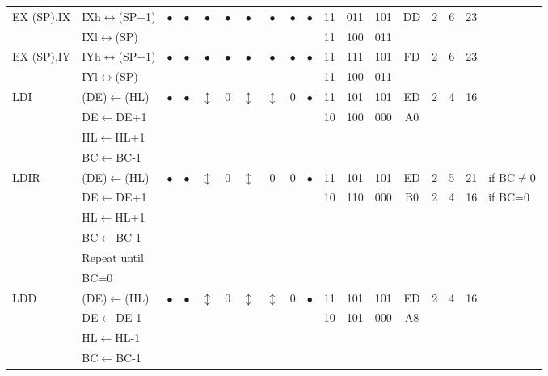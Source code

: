 \documentclass[oneside,a4paper]{book}
\begin{document}
{\begin{tabular}{llc@{ }c@{ }c@{ }c@{ }c@{ }c@{ }c@{ }cc@{ }c@{ }cccccll}
EX (SP),IX & IXh$\leftrightarrow$(SP+1) & 
	$\bullet$ & $\bullet$ & $\bullet$ & $\bullet$ & $\bullet$ & $\bullet$ & $\bullet$ & $\bullet$ & 11 & 011 & 101
	& DD & 2 & 6 & 23 & & \\ 
	& IXl$\leftrightarrow$(SP) & \multicolumn{8}{c}{} & 11 & 100 & 011 & \multicolumn{4}{c}{} & & \\ 

EX (SP),IY & IYh$\leftrightarrow$(SP+1) & 
	$\bullet$ & $\bullet$ & $\bullet$ & $\bullet$ & $\bullet$ & $\bullet$ & $\bullet$ & $\bullet$ & 11 & 111 & 101
	& FD & 2 & 6 & 23 & & \\ 
	& IYl$\leftrightarrow$(SP) & \multicolumn{8}{c}{} & 11 & 100 & 011 & \multicolumn{4}{c}{} & & \\ 

LDI & (DE)$\leftarrow$(HL) & 
	$\bullet$ & $\bullet$ & $\updownarrow$\footnotemark[4] & 0 & $\updownarrow$\footnotemark[4] & $\updownarrow$\footnotemark[1] & 0 & $\bullet$ & 11 & 101 & 101
	& ED & 2 & 4 & 16 & & \\ 
	& DE$\leftarrow$DE+1 & \multicolumn{8}{c}{} & 10 & 100 & 000 & A0 & \multicolumn{3}{c}{} & & \\ 
	& HL$\leftarrow$HL+1 & \multicolumn{15}{c}{} & & \\
	& BC$\leftarrow$BC-1 & \multicolumn{15}{c}{} & & \\ 

LDIR & (DE)$\leftarrow$(HL) & 
	$\bullet$ & $\bullet$ & $\updownarrow$\footnotemark[4] & 0 & $\updownarrow$\footnotemark[4] & 0\footnotemark[2] & 0 & $\bullet$ & 11 & 101 & 101
	& ED & 2 & 5 & 21 & \multicolumn{2}{l}{if BC$\not=$0} \\ 
	& DE$\leftarrow$DE+1 & \multicolumn{8}{c}{} & 10 & 110 & 000 & B0 & 2 & 4 & 16 & \multicolumn{2}{l}{if BC=0} \\
	& HL$\leftarrow$HL+1 & \multicolumn{15}{c}{} & & \\
	& BC$\leftarrow$BC-1 & \multicolumn{15}{c}{} & & \\ 
	& Repeat until& \multicolumn{15}{c}{} & & \\ 
	& BC=0 & \multicolumn{15}{c}{} & & \\ 

LDD & (DE)$\leftarrow$(HL) & 
	$\bullet$ & $\bullet$ & $\updownarrow$\footnotemark[4] & 0 & $\updownarrow$\footnotemark[4] & $\updownarrow$\footnotemark[1] & 0 & $\bullet$ & 11 & 101 & 101
	& ED & 2 & 4 & 16 & & \\ 
	& DE$\leftarrow$DE-1 & \multicolumn{8}{c}{} & 10 & 101 & 000 & A8 & \multicolumn{3}{c}{} & & \\ 
	& HL$\leftarrow$HL-1 & \multicolumn{15}{c}{} & & \\
	& BC$\leftarrow$BC-1 & \multicolumn{15}{c}{} & & \\ 


\end{tabular}}
\end{document}
